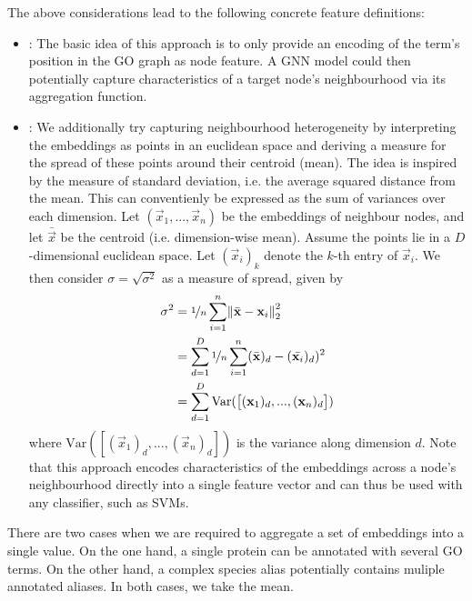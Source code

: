 \documentclass[
	fontsize=10pt, %
	twoside=false, %
	secnumdepth=1, %
  toc=indentunnumbered %
]{kaobook}
\begin{document}
The above considerations lead to the following concrete feature definitions:
\begin{itemize}
\item {}: The basic idea of this approach is to only provide an
  encoding of the term's position in the GO graph as node feature. A GNN model
  could then potentially capture characteristics of a target node's
  neighbourhood via its aggregation function.
\item {}: We additionally try capturing neighbourhood
  heterogeneity by interpreting the embeddings as points in an euclidean space
  and deriving a measure for the spread of these points around their centroid
  (mean). The idea is inspired by the measure of standard deviation, i.e. the
  average squared distance from the mean. This can conventienly be expressed as
  the sum of variances over each dimension. Let $(\vec x_1, ..., \vec x_n)$ be
  the embeddings of neighbour nodes, and let $\bar{\vec x}$ be the centroid
  (i.e. dimension-wise mean). Assume the points lie in a $D$-dimensional
  euclidean space. Let $(\vec x_i)_k$ denote the $k$-th entry of $\vec x_i$. We
  then consider $\sigma = \sqrt{\sigma^2}$ as a measure of spread, given by
  \begin{align*}
    \sigma^2 &= \nicefrac{1}{n} \sum_{i=1}^n \norm{\bar{\mathbf{x}} - \mathbf{x}_i}_2^2 \\
             &= \sum_{d=1}^D \nicefrac{1}{n} \sum_{i=1}^n
               (\bar{\mathbf{x}})_d - (\bar{\mathbf{x}_i})_d)^2 \\
             &= \sum_{d=1}^D \text{Var}(\left[
               (\mathbf{x}_1)_d, ..., (\mathbf{x}_n)_d
               \right])
  \end{align*}
  where $\text{Var}(\left[(\vec x_1)_d, ..., (\vec x_n)_d \right])$ is the
  variance along dimension $d$.
  Note that this approach encodes characteristics of the embeddings across a
  node's neighbourhood directly into a single feature vector and can thus be
  used with any classifier, such as SVMs.
\end{itemize}


There are two cases when we are required to
aggregate a set of embeddings into a single value. On the one hand, a single
protein can be annotated with several GO terms. On the other hand, a complex
species alias potentially contains muliple annotated aliases. In both cases,
we take the mean.
\end{document}
